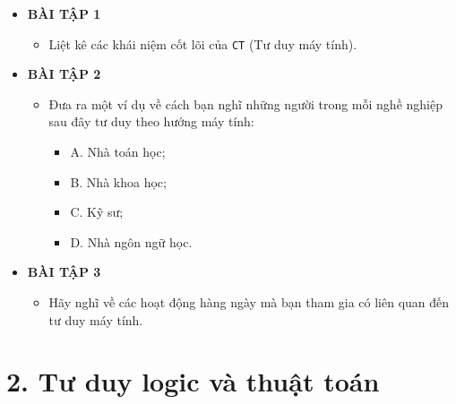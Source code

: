 \begin{itemize}
    \item \textbf{BÀI TẬP 1}
    \begin{itemize}
        \item Liệt kê các khái niệm cốt lõi của \texttt{CT} (Tư duy máy tính).
    \end{itemize}

    \item \textbf{BÀI TẬP 2}
    \begin{itemize}
        \item Đưa ra một ví dụ về cách bạn nghĩ những người trong mỗi nghề nghiệp sau đây tư duy theo hướng máy tính:
        \begin{itemize}
            \item A. Nhà toán học;
            \item B. Nhà khoa học;
            \item C. Kỹ sư;
            \item D. Nhà ngôn ngữ học.
        \end{itemize}
    \end{itemize}

    \item \textbf{BÀI TẬP 3}
    \begin{itemize}
        \item Hãy nghĩ về các hoạt động hàng ngày mà bạn tham gia có liên quan đến tư duy máy tính.
    \end{itemize}
\end{itemize}

\section*{2. Tư duy logic và thuật toán}

